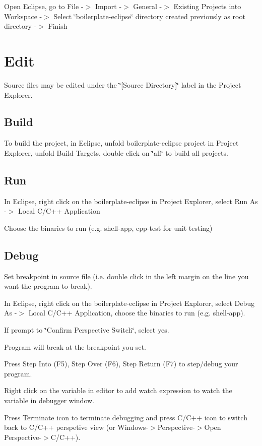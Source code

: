 Open Eclipse, go to File -\/$>$ Import -\/$>$ General -\/$>$ Existing Projects into Workspace -\/$>$ Select \char`\"{}boilerplate-\/eclipse\char`\"{} directory created previously as root directory -\/$>$ Finish

\section*{Edit}

Source files may be edited under the \char`\"{}\mbox{[}\+Source Directory\mbox{]}\char`\"{} label in the Project Explorer.

\subsection*{Build}

To build the project, in Eclipse, unfold boilerplate-\/eclipse project in Project Explorer, unfold Build Targets, double click on \char`\"{}all\char`\"{} to build all projects.

\subsection*{Run}


\begin{DoxyEnumerate}
\item In Eclipse, right click on the boilerplate-\/eclipse in Project Explorer, select Run As -\/$>$ Local C/\+C++ Application
\item Choose the binaries to run (e.\+g. shell-\/app, cpp-\/test for unit testing)
\end{DoxyEnumerate}

\subsection*{Debug}


\begin{DoxyEnumerate}
\item Set breakpoint in source file (i.\+e. double click in the left margin on the line you want the program to break).
\item In Eclipse, right click on the boilerplate-\/eclipse in Project Explorer, select Debug As -\/$>$ Local C/\+C++ Application, choose the binaries to run (e.\+g. shell-\/app).
\item If prompt to \char`\"{}\+Confirm Perspective Switch\char`\"{}, select yes.
\item Program will break at the breakpoint you set.
\item Press Step Into (F5), Step Over (F6), Step Return (F7) to step/debug your program.
\item Right click on the variable in editor to add watch expression to watch the variable in debugger window.
\item Press Terminate icon to terminate debugging and press C/\+C++ icon to switch back to C/\+C++ perspetive view (or Windows-\/$>$Perspective-\/$>$Open Perspective-\/$>$C/\+C++).
\end{DoxyEnumerate}

